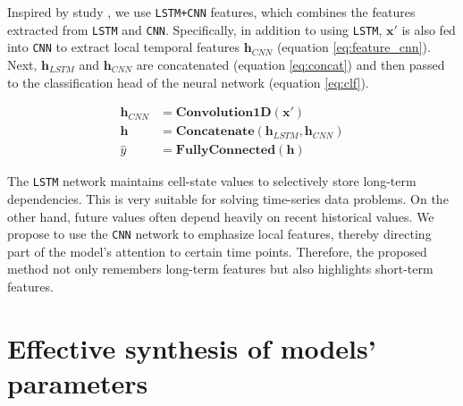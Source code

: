Inspired by study \cite{vo2017multi}, we use \verb|LSTM+CNN| features, which combines the features extracted from \verb|LSTM| and \verb|CNN|. Specifically, in addition to using \verb|LSTM|, $\mathbf{x'}$ is also fed into \verb|CNN| to extract local temporal features $\mathbf{h}_{CNN}$ (equation \ref{eq:feature_cnn}). Next, $\mathbf{h}_{LSTM}$ and $\mathbf{h}_{CNN}$ are concatenated (equation \ref{eq:concat}) and then passed to the classification head of the neural network (equation \ref{eq:clf}).

\begin{align}
    \mathbf{h}_{CNN} &= \mathbf{Convolution1D}\left( \mathbf{x'} \right) \label{eq:feature_cnn}\\
    \mathbf{h} &= \mathbf{Concatenate}\left( \mathbf{h}_{LSTM}, \mathbf{h}_{CNN} \right) \label{eq:concat} \\
    \hat y &= \mathbf{FullyConnected}\left( \mathbf{h} \right) \label{eq:clf}
\end{align}


The \verb|LSTM| network maintains cell-state values to selectively store long-term dependencies. This is very suitable for solving time-series data problems. On the other hand, future values often depend heavily on recent historical values. We propose to use the \verb|CNN| network to emphasize local features, thereby directing part of the model's attention to certain time points. Therefore, the proposed method not only remembers long-term features but also highlights short-term features.


\section{Effective synthesis of models' parameters}

